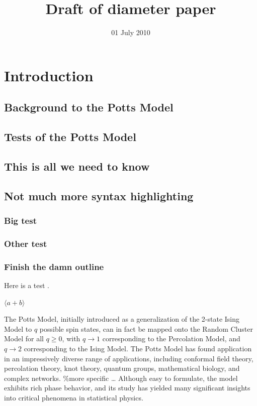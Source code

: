 \documentclass[aps, twocolumn, groupedaddress]{revtex4}
\title{Draft of diameter paper}
\date{01 July 2010}
\newcommand{\lb}{{\langle}}
\newcommand{\rb}{{\rangle}}
\begin{document}
\section{Introduction}
\label{sec-1}
\subsection{Background to the Potts Model}
\label{sec-1.1}
\subsection{Tests of the Potts Model}
\label{sec-1.2}
\subsection{This is all we need to know}
\label{sec-1.3}
\subsection{Not much more syntax highlighting}
\label{sec-1.4}
\subsubsection{Big test}
\label{sec-1.4.1}
\subsubsection{Other test}
\label{sec-1.4.2}
\subsubsection{Finish the damn outline}
\label{sec-1.4.3}

Here is a test \cite{OsSo04}.  

$\lb a + b \rb$    
    
The Potts Model, initially introduced as a generalization of the 2-state Ising Model to $q$ possible spin states, can in fact be mapped onto the Random Cluster Model for all $q \ge 0$, with $q \to 1$ corresponding to the Percolation Model, and $q \to 2$ corresponding to the Ising Model.  The Potts Model has found application in an impressively diverse range of applications, including conformal field theory, percolation theory, knot theory, quantum groups, mathematical biology, and complex networks.    
\%more specific \ldots{}    
Although easy to formulate, the model exhibits rich phase behavior, and its study has yielded many significant insights into critical phenomena in statistical physics. 
\end{document}
